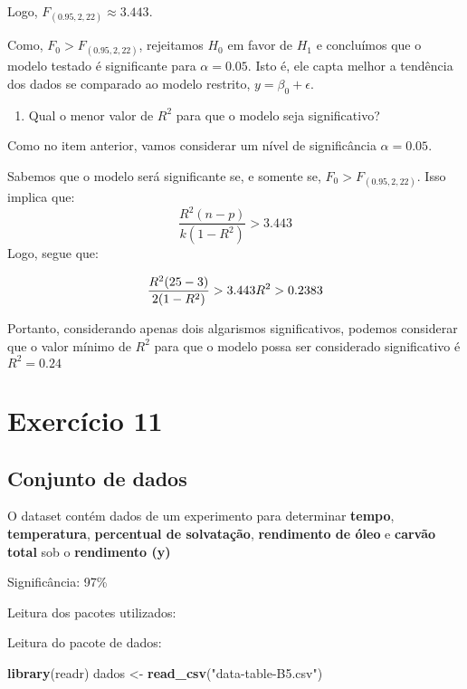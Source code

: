\documentclass[
]{article}
\newenvironment{Shaded}{\begin{snugshade}}{\end{snugshade}}
\newcommand{\KeywordTok}[1]{\textcolor[rgb]{0.13,0.29,0.53}{\textbf{#1}}}
\newcommand{\NormalTok}[1]{#1}
\newcommand{\StringTok}[1]{\textcolor[rgb]{0.31,0.60,0.02}{#1}}
\providecommand{\tightlist}{%
  \setlength{\itemsep}{0pt}\setlength{\parskip}{0pt}}
\begin{document}
Logo, \(F_{(0.95,2,22)} \approx 3.443\).

Como, \(F_0 > F_{(0.95,2,22)}\), rejeitamos \(H_0\) em favor de \(H_1\)
e concluímos que o modelo testado é significante para \(\alpha = 0.05\).
Isto é, ele capta melhor a tendência dos dados se comparado ao modelo
restrito, \(y = \beta_0 + \epsilon\).

\begin{enumerate}
\def\labelenumi{\alph{enumi})}
\setcounter{enumi}{1}
\tightlist
\item
  Qual o menor valor de \(R^2\) para que o modelo seja significativo?
\end{enumerate}

Como no item anterior, vamos considerar um nível de significância
\(\alpha = 0.05\).

Sabemos que o modelo será significante se, e somente se,
\(F_0 > F_{(0.95,2,22)}\). Isso implica que:
\[\frac{R^2(n-p)}{k (1- R^2)} > 3.443\] Logo, segue que:

\[\frac{R^2(25-3)}{2 (1- R^2)} > 3.443 \\
R^2>0.2383\]

Portanto, considerando apenas dois algarismos significativos, podemos
considerar que o valor mínimo de \(R^2\) para que o modelo possa ser
considerado significativo é \(R^2 = 0.24\)

\hypertarget{exercuxedcio-11}{%
\section{Exercício 11}\label{exercuxedcio-11}}

\hypertarget{conjunto-de-dados}{%
\subsection{Conjunto de dados}\label{conjunto-de-dados}}

O dataset contém dados de um experimento para determinar \textbf{tempo},
\textbf{temperatura}, \textbf{percentual de solvatação},
\textbf{rendimento de óleo} e \textbf{carvão total} sob o
\textbf{rendimento (y)}

Significância: 97\%

Leitura dos pacotes utilizados:

Leitura do pacote de dados:

\begin{Shaded}
\begin{Highlighting}[]
\KeywordTok{library}\NormalTok{(readr)}
\NormalTok{dados <-}\StringTok{ }\KeywordTok{read_csv}\NormalTok{(}\StringTok{"data-table-B5.csv"}\NormalTok{)}
\end{Highlighting}
\end{Shaded}
\end{document}
